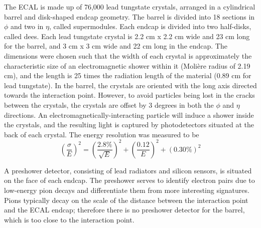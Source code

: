 The ECAL is made up of 
76,000 lead tungstate crystals,
arranged in a cylindrical barrel and disk-shaped endcap geometry.  
The barrel is divided into 18 sections in $\phi$ and 
two in $\eta$, called supermodules.  
Each endcap is divided into two half-disks, called dees.  
Each lead tungstate crystal is 
2.2 cm x 2.2 cm wide and 23 cm long for the barrel, 
and 3 cm x 3 cm wide and 22 cm long in the endcap.  
The dimensions were chosen such that the width 
of each crystal is approximately the characteristic size of 
an electromagnetic shower within it 
(Moli\`ere radius of 2.19 cm),
and the length is 
25 times the radiation length 
of the material (0.89 cm for lead tungstate).  
In the barrel, the crystals are oriented with the long axis
directed towards the interaction point.  
However, to avoid particles being lost in the cracks 
between the crystals,
the crystals are offset by 3 degrees in both the 
$\phi$ and $\eta$ directions.  
An electromagnetically-interacting particle will 
induce a shower inside the crystals, 
and the resulting light is captured by 
photodetectors situated at the back of each crystal.  
The energy resolution was measured to be 
\[
\left(\frac{\sigma}{E}\right)^2 = \left(\frac{2.8\%}{\sqrt{E}}\right)^2 + \left(\frac{0.12}{E}\right)^2 + \left(0.30\%\right)^2
\]

A preshower detector, consisting of lead radiators 
and silicon sensors, 
is situated on the face of each endcap.  
The preshower serves to identify electron pairs due to low-energy 
pion decays and differentiate them from more 
interesting signatures.  
Pions typically decay on the scale 
of the distance between the interaction point and the 
ECAL endcap;
therefore there is no preshower detector for the barrel, 
which is too close to the interaction point.  

